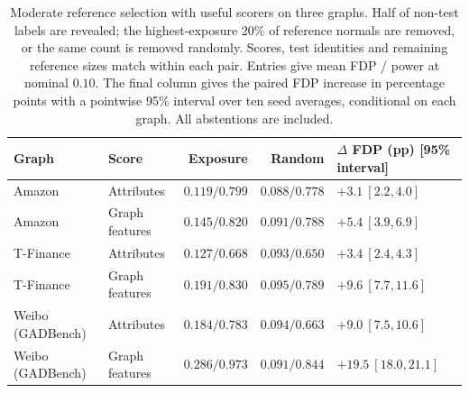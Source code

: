 \begin{table}[t]
\centering\small\setlength{\tabcolsep}{5pt}
\caption{Moderate reference selection with useful scorers on three graphs. Half of non-test labels are revealed; the highest-exposure 20\% of reference normals are removed, or the same count is removed randomly. Scores, test identities and remaining reference sizes match within each pair. Entries give mean FDP / power at nominal $0.10$. The final column gives the paired FDP increase in percentage points with a pointwise 95\% interval over ten seed averages, conditional on each graph. All abstentions are included.}
\label{tab:threegraphs}
\begin{tabular}{llrrl}\toprule
Graph & Score & Exposure & Random & $\Delta$ FDP (pp) [95\% interval]\\\midrule
Amazon & Attributes & $0.119/0.799$ & $0.088/0.778$ & $+3.1\ [2.2,4.0]$ \\
Amazon & Graph features & $0.145/0.820$ & $0.091/0.788$ & $+5.4\ [3.9,6.9]$ \\
T-Finance & Attributes & $0.127/0.668$ & $0.093/0.650$ & $+3.4\ [2.4,4.3]$ \\
T-Finance & Graph features & $0.191/0.830$ & $0.095/0.789$ & $+9.6\ [7.7,11.6]$ \\
Weibo (GADBench) & Attributes & $0.184/0.783$ & $0.094/0.663$ & $+9.0\ [7.5,10.6]$ \\
Weibo (GADBench) & Graph features & $0.286/0.973$ & $0.091/0.844$ & $+19.5\ [18.0,21.1]$ \\
\bottomrule\end{tabular}
\end{table}
